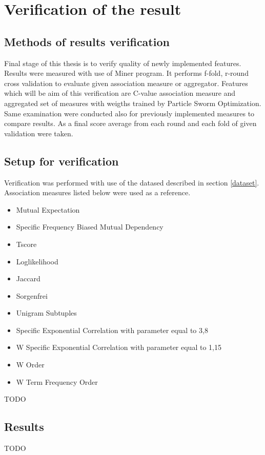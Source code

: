 \chapter{Verification of the result} \label{verification}

\section{Methods of results verification}
Final stage of this thesis is to verify quality of newly implemented features. Results were measured with use of Miner program. 
It performs f-fold, r-round cross validation to evaluate given association measure or aggregator. Features which will be aim of 
this verification are C-value association measure and aggregated set of measures with weigths trained by Particle Sworm Optimization. 
Same examination were conducted also for previously implemented measures to compare results. As a final score average from each round 
and each fold of given validation were taken.

\section{Setup for verification}
Verification was performed with use of the datased described in section \ref{dataset}. Association measures listed below 
were used as a reference.
\begin{itemize}
    \setlength\itemsep{0em}
    \item Mutual Expectation
    \item Specific Frequency Biased Mutual Dependency
    \item Tscore
    \item Loglikelihood
    \item Jaccard
    \item Sorgenfrei
    \item Unigram Subtuples
    \item Specific Exponential Correlation with parameter equal to 3,8
    \item W Specific Exponential Correlation with parameter equal to 1,15
    \item W Order
    \item W Term Frequency Order
\end{itemize}

TODO


\section{Results}

TODO